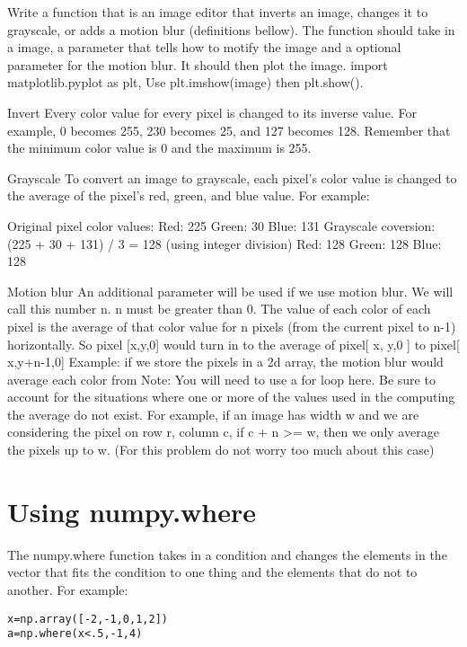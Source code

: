 \begin{problem}
Write a function that is an image editor that inverts an image, changes it to grayscale, or adds a motion blur (definitions bellow). The function should take in a image, a parameter that tells how to motify the image and a optional parameter for the motion blur. It should then plot the image. import matplotlib.pyplot as plt, Use plt.imshow(image) then plt.show().
\end{problem}

Invert
Every color value for every pixel is changed to its inverse value. For example, 0 
becomes 255, 230 becomes 25, and 127 becomes 128. Remember that the minimum 
color value is 0 and the maximum is 255.

Grayscale
To convert an image to grayscale, each pixel’s color value is changed to the average of 
the pixel’s red, green, and blue value. For example:

Original pixel color values:
Red: 225 Green: 30 Blue: 131
Grayscale coversion: (225 + 30 + 131) / 3 = 128 (using integer division)
Red: 128 Green: 128 Blue: 128

Motion blur
An additional parameter will be used if we use motion blur. We will call this number n. n must be greater than 0.
The value of each color of each pixel is the average of that color value for n pixels (from 
the current pixel to n-1) horizontally. So pixel [x,y,0] would turn in to the average of pixel[ x, y,0 ] to pixel[ x,y+n-1,0] 
Example: if we store the pixels in a 2d array, the motion blur would average each color 
from Note: You will need to use a for loop here.
Be sure to account for the situations where one or more of the values used in the 
computing the average do not exist. For example, if an image has width w and we are 
considering the pixel on row r, column c, if c + n >= w, then we only average the pixels 
up to w. (For this problem do not worry too much about this case)

\section*{Using numpy.where}

The numpy.where function takes in a condition and changes the elements in the vector that fits the condition to one thing and the elements that do not to another. For example:

\begin{lstlisting}
x=np.array([-2,-1,0,1,2])
a=np.where(x<.5,-1,4)
\end{lstlisting}

